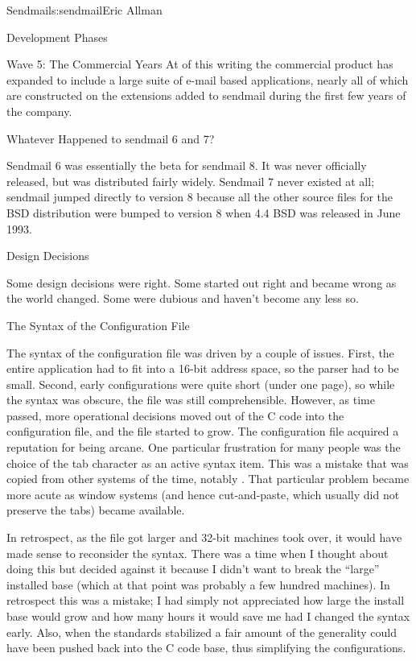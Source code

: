 \begin{aosachapter}{Sendmail}{s:sendmail}{Eric Allman}
\begin{aosasect1}{Development Phases}
\begin{aosasect2}{Wave 5: The Commercial Years}
At of this writing the commercial product has expanded to include a large
suite of e-mail based applications, nearly all of which are constructed
on the extensions added to sendmail during the first few years of the
company.

\end{aosasect2}

\begin{aosasect2}{Whatever Happened to sendmail 6 and 7?}

Sendmail 6 was essentially the beta for sendmail 8. It was never
officially released, but was distributed fairly widely. Sendmail 7
never existed at all; sendmail jumped directly to version 8 because
all the other source files for the BSD distribution were bumped to
version 8 when 4.4 BSD was released in June 1993.

\end{aosasect2}

\end{aosasect1}

\begin{aosasect1}{Design Decisions}

Some design decisions were right. Some started out right and became
wrong as the world changed. Some were dubious and haven't become any
less so.

\begin{aosasect2}{The Syntax of the Configuration File}

The syntax of the configuration file was driven by a couple of issues.
First, the entire application had to fit into a 16-bit address space,
so the parser had to be small. Second, early configurations were quite
short (under one page), so while the syntax was obscure, the file was
still comprehensible.  However, as time passed, more operational
decisions moved out of the C code into the configuration file, and the
file started to grow. The configuration file acquired a reputation for
being arcane. One particular frustration for many people was the
choice of the tab character as an active syntax item. This was a
mistake that was copied from other systems of the time, notably
. That particular problem became more acute as window
systems (and hence cut-and-paste, which usually did not preserve the
tabs) became available.

In retrospect, as the file got larger and 32-bit machines took over,
it would have made sense to reconsider the syntax. There was a time
when I thought about doing this but decided against it because I
didn't want to break the ``large'' installed base (which at that point
was probably a few hundred machines). In retrospect this was a
mistake; I had simply not appreciated how large the install base would
grow and how many hours it would save me had I changed the syntax
early.  Also, when the standards stabilized a fair amount of the
generality could have been pushed back into the C code base, thus
simplifying the configurations.


\end{aosasect2}
\end{aosasect1}
\end{aosachapter}
